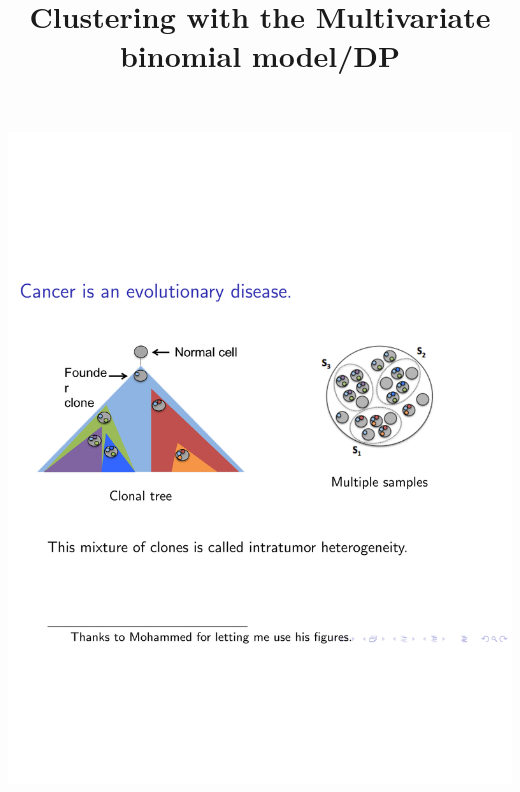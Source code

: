 \documentclass{beamer}
\title{Clustering with the Multivariate binomial model/DP}
\begin{document}
\begin{frame}
\titlepage
\end{frame}

\begin{frame}
\vspace*{-3.5cm}
\hspace*{-1.17cm}
\includegraphics[page=1, width=\paperwidth]{DDL-UTRA-2016-intro.pdf}
\end{frame}
\end{document}
